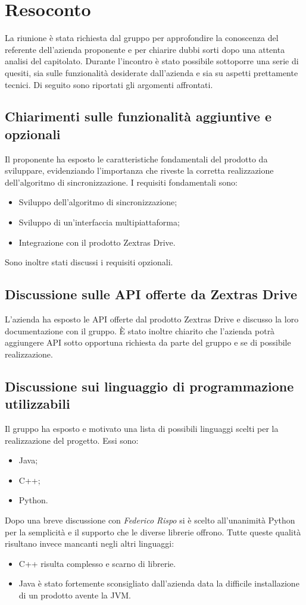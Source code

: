 \newpage


\section{Resoconto}
La riunione è stata richiesta dal gruppo \textit{\Gruppo{}} per approfondire la conoscenza del referente dell'azienda proponente e per chiarire dubbi sorti dopo una attenta analisi del capitolato.
Durante l'incontro è stato possibile sottoporre una serie di quesiti, sia sulle funzionalità desiderate dall'azienda e sia su aspetti prettamente tecnici.
Di seguito sono riportati gli argomenti affrontati.
\subsection{Chiarimenti sulle funzionalità aggiuntive e opzionali}
Il proponente ha esposto le caratteristiche fondamentali del prodotto da sviluppare, evidenziando l'importanza che riveste la corretta realizzazione dell'algoritmo di sincronizzazione.
I requisiti fondamentali sono:
\begin{itemize}
	\item Sviluppo dell'algoritmo di sincronizzazione;
	\item Sviluppo di un'interfaccia multipiattaforma;
	\item Integrazione con il prodotto Zextras Drive.
\end{itemize}
Sono inoltre stati discussi i requisiti opzionali.
\subsection{Discussione sulle API offerte da Zextras Drive}
L'azienda ha esposto le API offerte dal prodotto Zextras Drive e discusso la loro documentazione con il gruppo. È stato inoltre chiarito che l'azienda potrà aggiungere API sotto opportuna richiesta da parte del gruppo e se di possibile realizzazione.
\subsection{Discussione sui linguaggio di programmazione utilizzabili}
Il gruppo ha esposto e motivato una lista di possibili linguaggi scelti per la realizzazione del progetto. Essi sono:
\begin{itemize}
	\item Java;
	\item C++;
	\item Python.
\end{itemize}
Dopo una breve discussione con \textit{Federico Rispo} si è scelto all'unanimità Python per la semplicità e il supporto che le diverse librerie offrono. Tutte queste qualità risultano invece mancanti negli altri linguaggi:
\begin{itemize}
\item C++ risulta complesso e scarno di librerie.
\item Java è stato fortemente sconsigliato dall'azienda data la difficile installazione di un prodotto avente la JVM.
\end{itemize}
